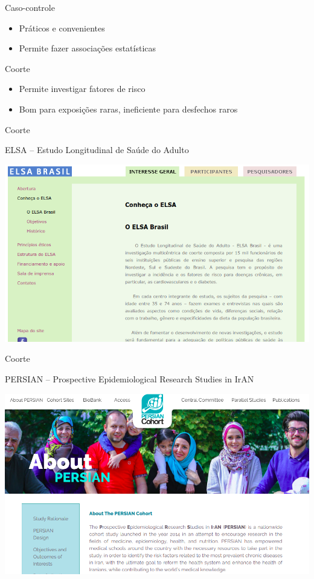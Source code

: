 \documentclass{beamer}
\begin{document}
\begin{frame}{Caso-controle}
  \begin{itemize}
    \small
  \item Práticos e convenientes
    \bigskip
  \item Permite fazer associações estatísticas
  \end{itemize}
\end{frame}

\begin{frame}{Coorte}
  \begin{itemize}
    \small
  \item Permite investigar fatores de risco
    \bigskip
  \item Bom para exposições raras, ineficiente para desfechos raros
  \end{itemize}
\end{frame}

\begin{frame}{Coorte}
  \begin{exampleblock}{{\footnotesize ELSA -- Estudo Longitudinal de Saúde do Adulto}}
    \begin{center}
      \includegraphics[width=.9\textwidth]{Metodos/coorte-ELSA}
    \end{center}
  \end{exampleblock}
\end{frame}

\begin{frame}{Coorte}
  \begin{exampleblock}{{\footnotesize PERSIAN -- Prospective Epidemiological Research Studies in IrAN}}
    \begin{center}
      \includegraphics[width=.9\textwidth]{Metodos/coorte-PERSIAN}
    \end{center}
  \end{exampleblock}
\end{frame}
\end{document}

